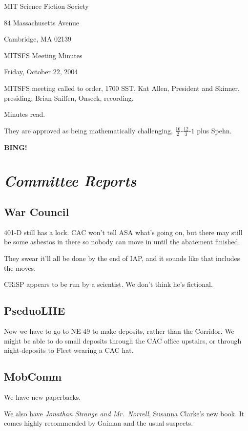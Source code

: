 \documentclass[10pt]{article}
\newcommand{\bing}{{\bf BING!} }
\newcommand{\goto}[1]{\bing \vskip 12pt \section*{{\em{#1}}}}
\newcommand{\ps}{ plus Spehn\xspace}
\begin{document}
\begin{center}

MIT Science Fiction Society

84 Massachusetts Avenue

Cambridge, MA 02139

\vspace{12pt}

MITSFS Meeting Minutes

Friday, October 22, 2004

\end{center}

\vspace{18pt}

\setlength{\parskip}{6pt}

\noindent
MITSFS meeting called to order, 1700 SST, Kat Allen, President and
Skinner, presiding; Brian Sniffen,  Onseck, recording.

Minutes read.

They are approved as being mathematically challenging, $\frac{16}{2}$-$\frac{12}{3}$-$1$\ps.

\goto{Committee Reports}
\subsection*{War Council}
401-D still has a lock.  CAC won't tell ASA what's going on, but there
may still be some asbestos in there so nobody can move in until the
abatement finished.

They swear it'll all be done by the end of IAP, and it sounds like
that includes the moves.

CRiSP appears to be run by a scientist.  We don't think he's fictional.

\subsection*{PseduoLHE}
Now we have to go to NE-49 to make deposits, rather than the Corridor.
We might be able to do small deposits through the CAC office upstairs,
or through night-deposits to Fleet wearing a CAC hat.

\subsection*{MobComm}
We have new paperbacks.

We also have \emph{Jonathan Strange and Mr.~Norrell}, Susanna Clarke's
new book.  It comes highly recommended by Gaiman and the usual suspects.
\end{document}
